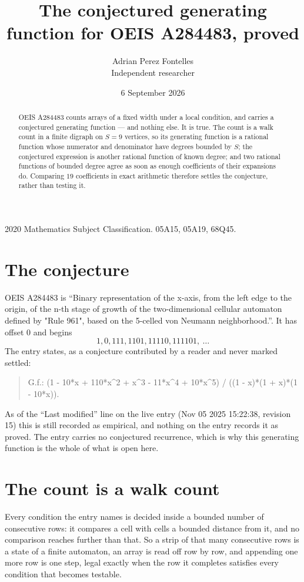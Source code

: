 \documentclass[11pt,a4paper]{article}
\title{The conjectured generating function for OEIS A284483, proved}
\author{Adrian Perez Fontelles\\ \small Independent researcher}
\date{6 September 2026}
\theoremstyle{plain}
\theoremstyle{definition}
\begin{document}
\maketitle

\begin{abstract}
OEIS A284483 counts arrays of a fixed width under a local condition, and carries a conjectured
generating function --- and nothing else. It is true. The count is a walk count in a finite
digraph on $S=9$ vertices, so its generating function is a rational function whose numerator
and denominator have degrees bounded by $S$; the conjectured expression is another rational
function of known degree; and two rational functions of bounded degree agree as soon as enough
coefficients of their expansions do. Comparing $19$ coefficients in exact arithmetic
therefore settles the conjecture, rather than testing it.
\end{abstract}

\noindent\small 2020 Mathematics Subject Classification. 05A15, 05A19, 68Q45.\normalsize

\section{The conjecture}

OEIS A284483 is ``Binary representation of the x-axis, from the left edge to the origin, of the n-th stage of growth of the two-dimensional cellular automaton defined by "Rule 961", based on the 5-celled von Neumann neighborhood.''. It has offset $0$ and begins
\[
1, 0, 111, 1101, 11110, 111101,\ \dots
\]
The entry states, as a conjecture contributed by a reader and never marked settled:
\begin{quote}
G.f.: (1 - 10*x + 110*x\^{}2 + x\^{}3 - 11*x\^{}4 + 10*x\^{}5) / ((1 - x)*(1 + x)*(1 - 10*x)).
\end{quote}
As of the ``Last modified'' line on the live entry (Nov 05 2025 15:22:38, revision 15) this is still
recorded as empirical, and nothing on the entry records it as proved. The entry carries no
conjectured recurrence, which is why this generating function is the whole of what is open
here.

\section{The count is a walk count}

Every condition the entry names is decided inside a bounded number of consecutive rows: it
compares a cell with cells a bounded distance from it, and no comparison reaches further than
that. So a strip of that many consecutive rows is a state of a finite automaton, an array is
read off row by row, and appending one more row is one step, legal exactly when the row it
completes satisfies every condition that becomes testable.
\end{document}
